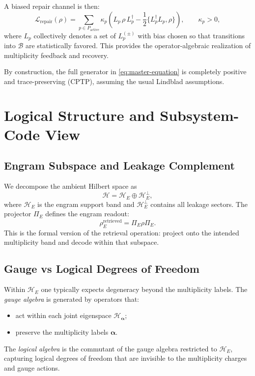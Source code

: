 \documentclass[11pt]{article}
\begin{document}
A biased repair channel is then:
\begin{equation}
  \mathcal L_{\text{repair}}(\rho)
  = \sum_{p \in P_{\text{active}}}
    \kappa_p \left( L_p \,\rho\, L_p^\dagger
      - \frac{1}{2} \{L_p^\dagger L_p, \rho\} \right),
  \qquad \kappa_p > 0,
\end{equation}
where $L_p$ collectively denotes a set of $L_p^{(\pm)}$ with bias chosen so
that transitions into $\mathcal B$ are statistically favored. This provides
the operator-algebraic realization of multiplicity feedback and recovery.

By construction, the full generator in \eqref{eq:master-equation} is
completely positive and trace-preserving (CPTP), assuming the usual
Lindblad assumptions.

\section{Logical Structure and Subsystem-Code View}

\subsection{Engram Subspace and Leakage Complement}

We decompose the ambient Hilbert space as
\begin{equation}
  \mathcal H = \mathcal H_E \oplus \mathcal H_E^\perp,
\end{equation}
where $\mathcal H_E$ is the engram support band and
$\mathcal H_E^\perp$ contains all leakage sectors. The projector
$\Pi_E$ defines the engram readout:
\begin{equation}
  \rho_E^{\text{retrieved}} = \Pi_E \rho \Pi_E.
\end{equation}
This is the formal version of the retrieval operation: project onto the
intended multiplicity band and decode within that subspace.

\subsection{Gauge vs Logical Degrees of Freedom}

Within $\mathcal H_E$ one typically expects degeneracy beyond the multiplicity
labels. The \emph{gauge algebra} is generated by operators that:
\begin{itemize}[leftmargin=*]
  \item act within each joint eigenspace $\mathcal H_{\boldsymbol\alpha}$;
  \item preserve the multiplicity labels $\boldsymbol\alpha$.
\end{itemize}
The \emph{logical algebra} is the commutant of the gauge algebra restricted
to $\mathcal H_E$, capturing logical degrees of freedom that are invisible to
the multiplicity charges and gauge actions.
\end{document}
